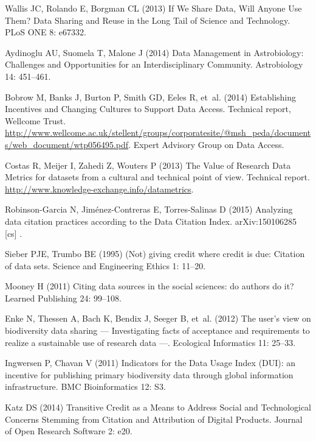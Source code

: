 \documentclass[english]{article}
\begin{document}
\begin{thebibliography}{10}
Wallis JC, Rolando E, Borgman CL (2013) If {We} {Share} {Data}, {Will} {Anyone}
  {Use} {Them}? {Data} {Sharing} and {Reuse} in the {Long} {Tail} of {Science}
  and {Technology}.
\newblock PLoS ONE 8: e67332.

Aydinoglu AU, Suomela T, Malone J (2014) Data {Management} in {Astrobiology}:
  {Challenges} and {Opportunities} for an {Interdisciplinary} {Community}.
\newblock Astrobiology 14: 451--461.

Bobrow M, Banks J, Burton P, Smith GD, Eeles R, et~al. (2014) Establishing
  {Incentives} and {Changing} {Cultures} to {Support} {Data} {Access}.
\newblock Technical report, Wellcome Trust.
\newblock
  \urlprefix\url{http://www.wellcome.ac.uk/stellent/groups/corporatesite/@msh_peda/documents/web_document/wtp056495.pdf}.
\newblock Expert Advisory Group on Data Access.

Costas R, Meijer I, Zahedi Z, Wouters P (2013) The {Value} of {Research} {Data}
  {Metrics} for datasets from a cultural and technical point of view.
\newblock Technical report.
\newblock \urlprefix\url{http://www.knowledge-exchange.info/datametrics}.

Robinson-Garcia N, Jiménez-Contreras E, Torres-Salinas D (2015) Analyzing data
  citation practices according to the {Data} {Citation} {Index}.
\newblock arXiv:150106285 [cs] .

Sieber PJE, Trumbo BE (1995) ({Not}) giving credit where credit is due:
  {Citation} of data sets.
\newblock Science and Engineering Ethics 1: 11--20.

Mooney H (2011) Citing data sources in the social sciences: do authors do it?
\newblock Learned Publishing 24: 99--108.

Enke N, Thessen A, Bach K, Bendix J, Seeger B, et~al. (2012) The user's view on
  biodiversity data sharing — {Investigating} facts of acceptance and
  requirements to realize a sustainable use of research data —.
\newblock Ecological Informatics 11: 25--33.

Ingwersen P, Chavan V (2011) Indicators for the {Data} {Usage} {Index} ({DUI}):
  an incentive for publishing primary biodiversity data through global
  information infrastructure.
\newblock BMC Bioinformatics 12: S3.

Katz DS (2014) Transitive {Credit} as a {Means} to {Address} {Social} and
  {Technological} {Concerns} {Stemming} from {Citation} and {Attribution} of
  {Digital} {Products}.
\newblock Journal of Open Research Software 2: e20.

\end{thebibliography}
\end{document}
